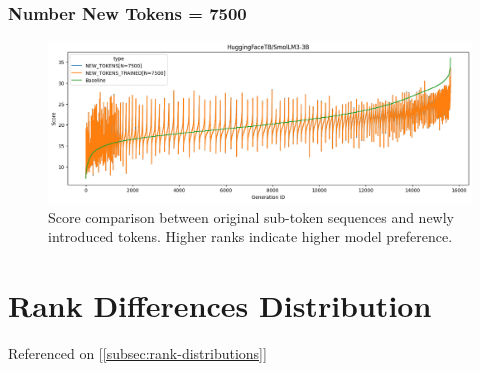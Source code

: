 \subsubsection{Number New Tokens = 7500}
\begin{figure}[H]
    \centering
    \includegraphics[width=\textwidth]{Figures/Appendix/token-rank-comparison_7500_smol3B.png}
    \caption[Score comparison for \textit{SmolLM3-3B} w/ 7500 new tokens]{Score comparison between original sub-token sequences and newly introduced tokens. Higher ranks indicate higher model preference.}
    \label{annex:fig:new_token_rank:7500_smol3B}
\end{figure}
\FloatBarrier





% 
%
%
%
\section{Rank Differences Distribution}
\label{annex:results-rank-differences}

Referenced on [\ref{subsec:rank-distributions}]


